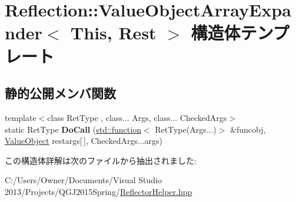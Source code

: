 \hypertarget{struct_reflection_1_1_value_object_array_expander}{}\section{Reflection\+:\+:Value\+Object\+Array\+Expander$<$ This, Rest $>$ 構造体テンプレート}
\label{struct_reflection_1_1_value_object_array_expander}
\subsection*{静的公開メンバ関数}
\begin{DoxyCompactItemize}
\item 
{\footnotesize template$<$class Ret\+Type , class... Args, class... Checked\+Args$>$ }\\static Ret\+Type {\bfseries Do\+Call} (\hyperlink{classstd_1_1function}{std\+::function}$<$ Ret\+Type(Args...)$>$ \&funcobj, \hyperlink{struct_reflection_1_1_value_object}{Value\+Object} restargs\mbox{[}$\,$\mbox{]}, Checked\+Args...\+args)\hypertarget{struct_reflection_1_1_value_object_array_expander_a7fd21cc3d62daf46aa0c98a34829d008}{}\label{struct_reflection_1_1_value_object_array_expander_a7fd21cc3d62daf46aa0c98a34829d008}

\end{DoxyCompactItemize}


この構造体詳解は次のファイルから抽出されました\+:\begin{DoxyCompactItemize}
\item 
C\+:/\+Users/\+Owner/\+Documents/\+Visual Studio 2013/\+Projects/\+Q\+G\+J2015\+Spring/\hyperlink{_reflector_helper_8hpp}{Reflector\+Helper.\+hpp}\end{DoxyCompactItemize}
